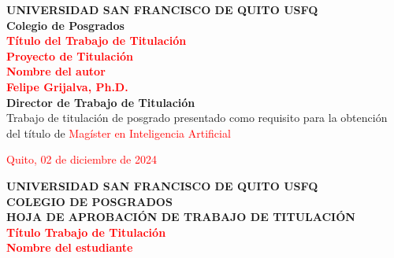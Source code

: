 \documentclass[journal]{IEEEtran}
\author{}
\date{}
\begin{document}
\onecolumn
\thispagestyle{empty} %

\begin{center}
\textbf{\fontsize{14}{16}\selectfont UNIVERSIDAD SAN FRANCISCO DE QUITO USFQ}\\
\vspace{40pt}
\textbf{\fontsize{14}{16}\selectfont Colegio de Posgrados}\\
\vspace{90pt}
\textbf{\fontsize{14}{16}\selectfont \textcolor{red}{Título del Trabajo de Titulación}}\\
\vspace{60pt}
\textbf{\fontsize{14}{16}\selectfont \textcolor{red}{Proyecto de Titulación}}\\
\vspace{90pt}
\textbf{\fontsize{18}{20}\selectfont \textcolor{red}{Nombre del autor}}\\
\vspace{70pt}
\textbf{\fontsize{16}{18}\selectfont \textcolor{red}{Felipe Grijalva, Ph.D.}}\\
\vspace{15pt}
\textbf{\fontsize{16}{18}\selectfont Director de Trabajo de Titulación}\\
\vspace{90pt}
\fontsize{12}{14}\selectfont Trabajo de titulación de posgrado presentado como requisito para la obtención del título de \textcolor{red}{Magíster en Inteligencia Artificial}
\vspace{40pt}
\end{center}

\begin{center}
\fontsize{12}{14}\selectfont \textcolor{red}{Quito, 02 de diciembre de 2024}
\end{center}

\newpage

\begin{center}
\textbf{\fontsize{18}{16}\selectfont UNIVERSIDAD SAN FRANCISCO DE QUITO USFQ}\\
\vspace{10pt}
\textbf{\fontsize{18}{16}\selectfont COLEGIO DE POSGRADOS}\\
\vspace{20pt}
\textbf{\fontsize{14}{16}\selectfont HOJA DE APROBACIÓN DE TRABAJO DE TITULACIÓN}\\
\vspace{10pt}
\textbf{\fontsize{14}{16}\selectfont \textcolor{red}{Título Trabajo de Titulación}}\\
\vspace{10pt}
\textbf{\fontsize{14}{16}\selectfont \textcolor{red}{Nombre del estudiante}}
\end{center}
\vspace{20pt}
\end{document}
